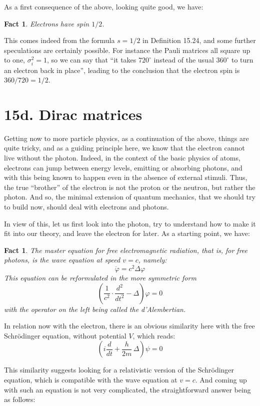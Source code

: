 \documentclass[12pt]{amsbook}
\newtheorem{fact}[theorem]{Fact}
\begin{document}
As a first consequence of the above, looking quite good, we have:

\begin{fact}
Electrons have spin $1/2$.
\end{fact}

This comes indeed from the formula $s=1/2$ in Definition 15.24, and some further speculations are certainly possible. For instance the Pauli matrices all square up to one, $\sigma_i^2=1$, so we can say that ``it takes $720^\circ$ instead of the usual $360^\circ$ to turn an electron back in place'', leading to the conclusion that the electron spin is $360/720=1/2$.

\section*{15d. Dirac matrices} 

Getting now to more particle physics, as a continuation of the above, things are quite tricky, and as a guiding principle here, we know that the electron cannot live without the photon. Indeed, in the context of the basic physics of atoms, electrons can jump between energy levels, emitting or absorbing photons, and with this being known to happen even in the absence of external stimuli. Thus, the true ``brother'' of the electron is not the proton or the neutron, but rather the photon. And so, the minimal extension of quantum mechanics, that we should try to build now, should deal with electrons and photons.

\bigskip

In view of this, let us first look into the photon, try to understand how to make it fit into our theory, and leave the electron for later. As a starting point, we have:

\begin{fact}
The master equation for free electromagnetic radiation, that is, for free photons, is the wave equation at speed $v=c$, namely:
$$\ddot{\varphi}=c^2\Delta\varphi$$
This equation can be reformulated in the more symmetric form
$$\left(\frac{1}{c^2}\cdot\frac{d^2}{dt^2}-\Delta\right)\varphi=0$$
with the operator on the left being called the d'Alembertian.
\end{fact}

In relation now with the electron, there is an obvious similarity here with the free Schr\"odinger equation, without potential $V$, which reads:
$$\left(i\frac{d}{dt}+\frac{h}{2m}\,\Delta\right)\psi=0$$

This similarity suggests looking for a relativistic version of the Schr\"odinger equation, which is compatible with the wave equation at $v=c$. And coming up with such an equation is not very complicated, the straightforward answer being as follows:
\end{document}
